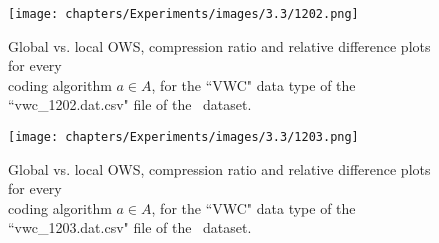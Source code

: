 \clearpage

\begin{figure}
\hspace{-70pt}
\texttt{[image: chapters/Experiments/images/3.3/1202.png]}
\hspace{+5pt}
\caption{Global vs. local OWS, compression ratio and relative difference plots for every\\coding algorithm $a \in A$, for the ``VWC" data type of the ``vwc\_1202.dat.csv" file of the \datasetirkis \ dataset.}
\label{fig:window-compare-1202}
\end{figure}


\clearpage

\begin{figure}
\hspace{-70pt}
\texttt{[image: chapters/Experiments/images/3.3/1203.png]}
\hspace{+5pt}
\caption{Global vs. local OWS, compression ratio and relative difference plots for every\\coding algorithm $a \in A$, for the ``VWC" data type of the ``vwc\_1203.dat.csv" file of the \datasetirkis \ dataset.}
\label{fig:window-compare-1203}
\end{figure}


\clearpage